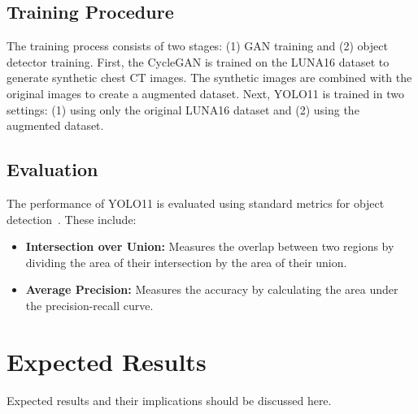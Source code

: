 \documentclass[runningheads]{llncs}
\begin{document}
\subsection{Training Procedure} %
The training process consists of two stages: (1) GAN training and (2) object detector training. First, the CycleGAN is trained on the LUNA16 dataset to generate synthetic chest CT images. The synthetic images are combined with the original images to create a augmented dataset. Next, YOLO11 is trained in two settings: (1) using only the original LUNA16 dataset and (2) using the augmented dataset.
\subsection{Evaluation} %
The performance of YOLO11 is evaluated using standard metrics for object detection~\cite{odmetrics}. These include:
\begin{itemize}
    \item \textbf{Intersection over Union:} Measures the overlap between two regions by dividing the area of their intersection by the area of their union.
    \item \textbf{Average Precision:} Measures the accuracy by calculating the area under the precision-recall curve.
\end{itemize}
\section{Expected Results} %
Expected results and their implications should be discussed here. %
%
%
%


\end{document}
